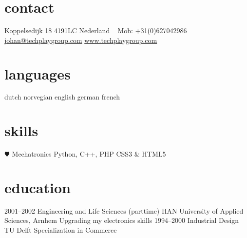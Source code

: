 \documentclass[]{friggeri-cv} %
\begin{document}


\begin{aside} %
\section{contact}
Koppelsedijk 18
4191LC
Nederland
~
Mob: +31(0)627042986
~
\href{mailto:johan@techplaygroup.com}{johan@techplaygroup.com}
\href{http://www.techplaygroup.com}{www.techplaygroup.com}
\section{languages}
dutch
norvegian
english
german
french
\section{skills}
{\color{red} $\varheartsuit$} Mechatronics
Python, C++, PHP
CSS3 \& HTML5
\end{aside}


\section{education}

\begin{entrylist}
\entry
{2001--2002}
{Engineering and Life Sciences {\normalfont (parttime)}}
{HAN University of Applied Sciences, Arnhem}
{Upgrading my electronics skills}
\entry
{1994--2000}
{Industrial Design}
{TU Delft}
{Specialization in Commerce}
\end{entrylist}

\end{document}
